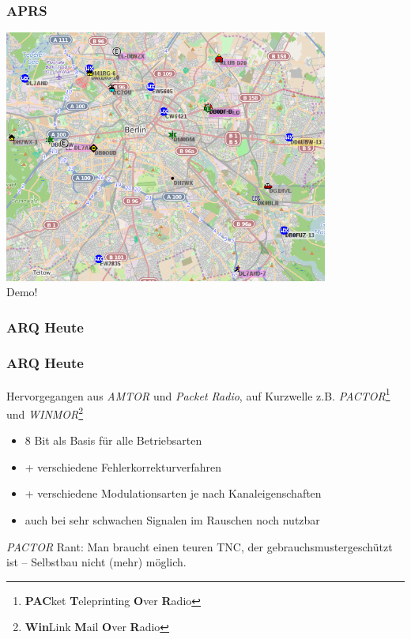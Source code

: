 \begin{frame}
    \frametitle{APRS}

    \begin{center}
        \includegraphics[width=0.8\textwidth,height=.8\textheight,keepaspectratio]{e16/APRS.png} \\
        \Large Demo!
    \end{center}

\end{frame}

\subsubsection{ARQ Heute}

\begin{frame}
    \frametitle{ARQ Heute}

    Hervorgegangen aus \emph{AMTOR} und \emph{Packet Radio}, auf Kurzwelle z.B.
    \emph{PACTOR}\footnote{\textbf{PAC}ket \textbf{T}eleprinting \textbf{O}ver
    \textbf{R}adio} und \emph{WINMOR}\footnote{\textbf{Win}Link \textbf{M}ail
    \textbf{O}ver \textbf{R}adio}

    \begin{itemize}
        \item 8 Bit als Basis für alle Betriebsarten
        \item + verschiedene Fehlerkorrekturverfahren
        \item + verschiedene Modulationsarten je nach Kanaleigenschaften
        \item auch bei sehr schwachen Signalen im Rauschen noch nutzbar
    \end{itemize}

    \vspace{0.5cm}

    \emph{PACTOR} Rant: Man braucht einen teuren TNC, der
    gebrauchsmustergeschützt ist -- Selbstbau nicht (mehr) möglich.

\end{frame}

